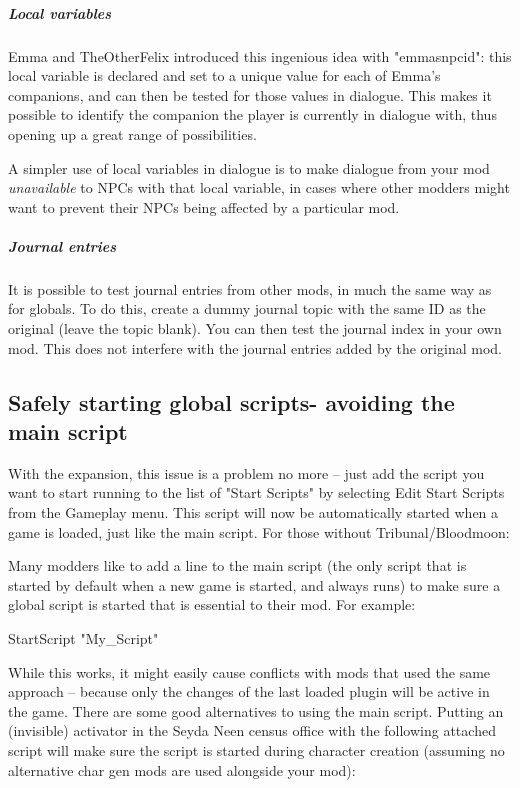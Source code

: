 \hypertarget{local-variables-1}{%
\subparagraph{Local variables}\label{local-variables-1}}

Emma and TheOtherFelix introduced this ingenious idea with "emmasnpcid":
this local variable is declared and set to a unique value for each of
Emma's companions, and can then be tested for those values in dialogue.
This makes it possible to identify the companion the player is currently
in dialogue with, thus opening up a great range of possibilities.

A simpler use of local variables in dialogue is to make dialogue from
your mod \emph{unavailable} to NPCs with that local variable, in cases
where other modders might want to prevent their NPCs being affected by a
particular mod.

\hypertarget{journal-entries}{%
\subparagraph{Journal entries}\label{journal-entries}}

It is possible to test journal entries from other mods, in much the same
way as for globals. To do this, create a dummy journal topic with the
same ID as the original (leave the topic blank). You can then test the
journal index in your own mod. This does not interfere with the journal
entries added by the original mod.

\hypertarget{safely-starting-global-scripts--avoiding-the-main-script}{%
\subsection{\texorpdfstring{\hfill\break
Safely starting global scripts- avoiding the main
script}{ Safely starting global scripts- avoiding the main script}}\label{safely-starting-global-scripts--avoiding-the-main-script}}

With the expansion, this issue is a problem no more -- just add the
script you want to start running to the list of "Start Scripts" by
selecting Edit Start Scripts from the Gameplay menu. This script will
now be automatically started when a game is loaded, just like the main
script. For those without Tribunal/Bloodmoon:

Many modders like to add a line to the main script (the only script that
is started by default when a new game is started, and always runs) to
make sure a global script is started that is essential to their mod. For
example:

StartScript "My\_Script"

While this works, it might easily cause conflicts with mods that used
the same approach -- because only the changes of the last loaded plugin
will be active in the game. There are some good alternatives to using
the main script. Putting an (invisible) activator in the Seyda Neen
census office with the following attached script will make sure the
script is started during character creation (assuming no alternative
char gen mods are used alongside your mod):

